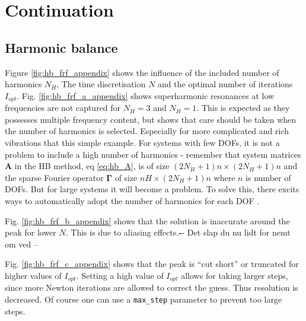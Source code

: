 
\chapter{Continuation}
\label{chap:cont_appendix}

\section{Harmonic balance}
\label{sec:hb_appendix}

Figure \ref{fig:hb_frf_appendix} shows the influence of the included number of
harmonics $N_H$, The time discretisation $N$ and the optimal number of
iterations $I_{opt}$. Fig. \ref{fig:hb_frf_a_appendix} shows superharmonic
resonances at low frequencies are not captured for $N_H=3$ and $N_H=1$. This is
expected as they possesses multiple frequency content, but shows that care
should be taken when the number of harmonics is selected. Especially for more
complicated and rich vibrations that this simple example. For systems with few
DOFs, it is not a problem to include a high number of harmonics - remember that
system matrices $\bm A$ in the HB method, eq \eqref{eq:hb_A}, is of size $(2N_H
+ 1)n \times (2N_H + 1)n$ and the sparse Fourier operator $\bm \Gamma$ of size
$nH \times(2N_H+1)n$ where $n$ is number of DOFs. But for large systems it will
become a problem. To solve this, there excits ways to automatically adopt the
number of harmonics for each DOF \autocite{GROLET2012a}.

Fig. \ref{fig:hb_frf_b_appendix} shows that the solution is inaccurate around
the peak for lower $N$. This is due to aliasing effects.{\textbf -- Det slap du
  nu lidt for nemt om ved --}

Fig. \ref{fig:hb_frf_c_appendix} shows that the peak is ``cut short'' or
truncated for higher values of $I_{opt}$. Setting a high value of $I_{opt}$
allows for taking larger steps, since more Newton iterations are allowed to
correct the guess. Thus resolution is decreased. Of course one can use a
\texttt{max\_step} parameter to prevent too large steps.

